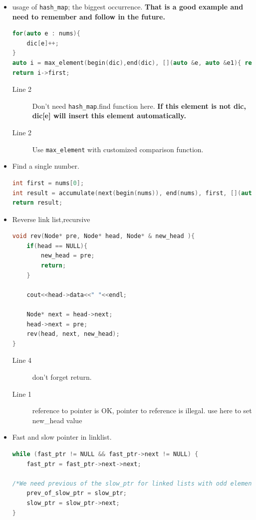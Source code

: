 \documentclass[a4paper,11pt,twoside]{book}
\begin{document}
\begin{itemize}
\item usage of \texttt{hash\_map}; the biggest occurrence. \textbf{That is a good example and need to remember and follow in the future.}
\begin{lstlisting}[frame=single, language=c++]	
for(auto e : nums){
	dic[e]++;
}
auto i = max_element(begin(dic),end(dic), [](auto &e, auto &e1){ return e.second< e1.second;});
return i->first;	
\end{lstlisting}
\begin{description}
	\item[Line 2] Don't need \texttt{hash\_map}.find function here. \textbf{If this element is not dic, dic[e] will insert this element automatically.} 
	\item[Line 2] Use \texttt{max\_element} with customized comparison function.	
\end{description}	
	
\item Find a single number. 
\begin{lstlisting}[frame=single, language=c++]	
int first = nums[0];
int result = accumulate(next(begin(nums)), end(nums), first, [](auto e, auto e1){ return e^e1; });
return result;	
\end{lstlisting}

\item Reverse link list,recursive
\begin{lstlisting}[frame=single, language=c++]	
void rev(Node* pre, Node* head, Node* & new_head ){
	if(head == NULL){
		new_head = pre;
		return;
	}
	
	cout<<head->data<<" "<<endl;
	
	Node* next = head->next;
	head->next = pre;
	rev(head, next, new_head);
}	
\end{lstlisting}
\begin{description}
	\item[Line 4] don't forget return.
	\item[Line 1] reference to pointer is OK, pointer to reference is illegal. use here to set new\_head value
\end{description}


\item Fast and slow pointer in linklist.	
\begin{lstlisting}[frame=single, language=c++]	
while (fast_ptr != NULL && fast_ptr->next != NULL) {
	fast_ptr = fast_ptr->next->next;
	
/*We need previous of the slow_ptr for linked lists with odd elements */
	prev_of_slow_ptr = slow_ptr;
	slow_ptr = slow_ptr->next;
}


\end{lstlisting}
\end{itemize}
\end{document}
